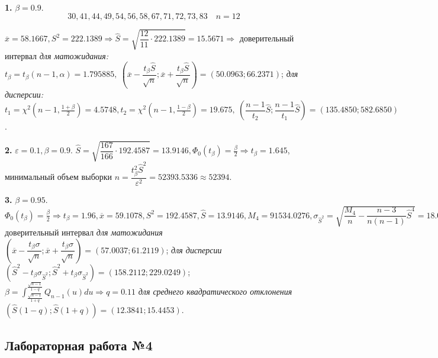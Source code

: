 \documentclass[9pt]{article}
\begin{document}
\ 
\par\textbf{1.} \(\beta=0.9.\)
\[30,41,44,49,54,56,58,67,71,72,73,83\quad n = 12\]
\par\(\overline{x}=58.1667, S^2=222.1389\Rightarrow\hat S = \sqrt{\dfrac{12}{11}\cdot222.1389}=15.5671\Rightarrow\) доверительный интервал \textit{для матожидания:} \( t_\beta=t_\beta(n-1,\alpha)=1.795885,\ (\overline{x}-\dfrac{t_\beta\hat S}{\sqrt{n}};\overline{x}+\dfrac{t_\beta\hat S}{\sqrt{n}})=(50.0963;66.2371)\); \textit{для дисперсии:} \(t_1=\chi^2(n-1,\frac{1+\beta}{2})=4.5748,t_2=\chi^2(n-1,\frac{1-\beta}{2})=19.675,\ (\dfrac{n-1}{t_2}\hat S;\dfrac{n-1}{t_1}\hat S)=(135.4850;582.6850)\).
\par\textbf{2.} \(\varepsilon=0.1,\beta=0.9\). \(\hat S = \sqrt{\dfrac{167}{166}\cdot192.4587}=13.9146, \Phi_0(t_\beta)=\frac{\beta}{2}\Rightarrow t_\beta=1.645\), минимальный объем выборки \(n=\dfrac{t_\beta^2\hat S^2}{\varepsilon^2}=52393.5336\approx52394\).
\par\textbf{3.} \(\beta=0.95\). \(\Phi_0(t_\beta)=\frac{\beta}{2}\Rightarrow t_\beta=1.96, \overline{x}=59.1078, S^2=192.4587, \hat S = 13.9146, M_4=91534.0276,\sigma_{\hat S^2}=\sqrt{\dfrac{M_4}{n}-\dfrac{n-3}{n(n-1)}\hat S^4}=18.0647\Rightarrow\) доверительный интервал \textit{для матожидания} \((\overline x-\dfrac{t_\beta\sigma}{\sqrt{n}}; \overline x+\dfrac{t_\beta\sigma}{\sqrt{n}})=(57.0037;61.2119)\); \textit{для дисперсии} \((\hat{S}^2-t_\beta\sigma_{\hat{S}^2};\hat{S}^2+t_\beta\sigma_{\hat{S}^2})=(158.2112;229.0249)\); \(\beta=\int_\frac{\sqrt{n-1}}{1+q}^\frac{\sqrt{n-1}}{1-q}Q_{n-1}(u)du\Rightarrow q=0.11\) \textit{для среднего квадратического отклонения} \((\hat S(1-q);\hat S(1+q))=(12.3841;15.4453)\).

\subsection{Лабораторная работа №4}
\end{document}
